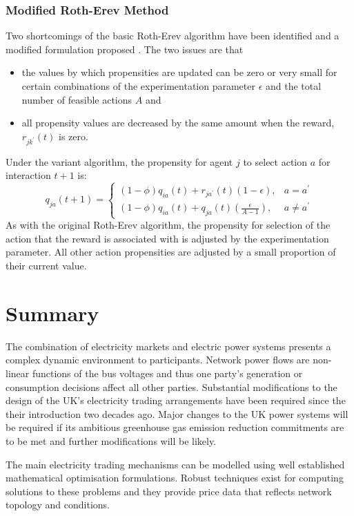 \subsubsection{Modified Roth-Erev Method}
\label{sec:variant}
Two shortcomings of the basic Roth-Erev algorithm have been identified and a
modified formulation proposed \cite{nicolaisen:2001}.  The two issues are that
\begin{itemize}
  \item the values by which propensities are updated can be zero or very small
  for certain combinations of the experimentation parameter $\epsilon$ and
  the total number of feasible actions $A$ and
  \item all propensity values are decreased by the same amount when the reward,
  $r_{jk^\prime}(t)$ is zero.
\end{itemize}
Under the variant algorithm, the propensity for agent $j$ to select action $a$
for interaction $t+1$ is:
\begin{equation}
q_{ja}(t+1) =
\begin{cases}
(1-\phi)q_{ia}(t) + r_{ja^\prime}(t)(1-\epsilon), & \text{$a = a^\prime$} \\
(1-\phi)q_{ia}(t) + q_{ja}(t)(\frac{\epsilon}{A-1}), & \text{$a \ne
a^\prime$}
\end{cases}
\end{equation}
As with the original Roth-Erev algorithm, the propensity for selection of the
action that the reward is associated with is adjusted by the experimentation
parameter.  All other action propensities are adjusted by a small proportion of
their current value.

\section{Summary}
The combination of electricity markets and electric power systems presents a
complex dynamic environment to participants.  Network power flows are
non-linear functions of the bus voltages and thus one party's generation or
consumption decisions affect all other parties.  Substantial modifications to
the design of the UK's electricity trading arrangements have been required
since the their introduction two decades ago.  Major changes to the UK power
systems will be required if its ambitious greenhouse gas emission reduction
commitments are to be met and further modifications will be likely.

The main electricity trading mechanisms can be modelled using well established
mathematical optimisation formulations.  Robust techniques exist for computing
solutions to these problems and they provide price data that reflects network
topology and conditions.

